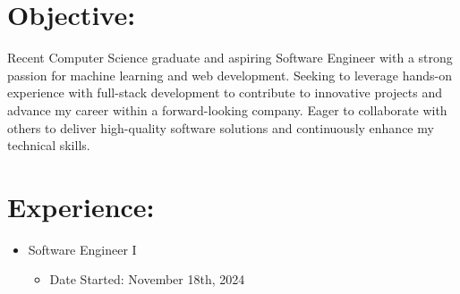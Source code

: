 \documentclass[12pt, oneside, a4paper]{article}
\begin{document}
\section*{Objective:}
\begin{flushleft}
    \footnotesize
    Recent Computer Science graduate and aspiring Software Engineer with a
    strong passion for machine learning and web development. Seeking to
    leverage hands-on experience with full-stack development to contribute to
    innovative projects and advance my career within a forward-looking company.
    Eager to collaborate with others to deliver high-quality software solutions
    and continuously enhance my technical skills.
\end{flushleft}

\section*{Experience:}
\begin{flushleft}
    \footnotesize
    \begin{itemize}
        \footnotesize
        \item Software Engineer I
            \begin{itemize}
                \item Date Started: November 18th, 2024
            \end{itemize}
    \end{itemize}
\end{flushleft}
\end{document}
